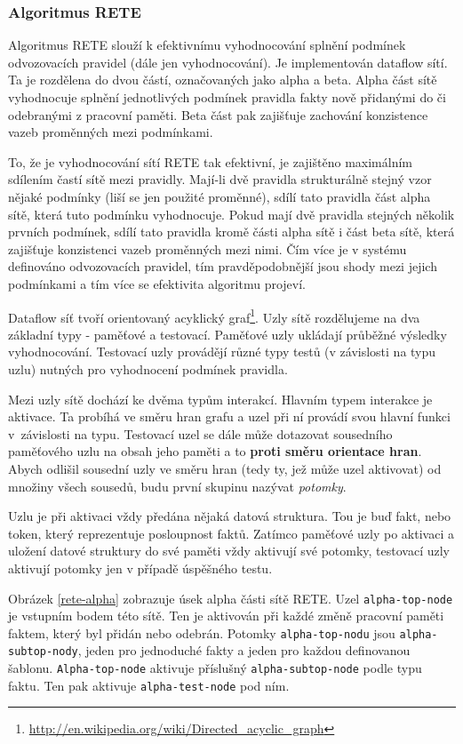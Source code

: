 \subsubsection{Algoritmus RETE}
\label{rete}

Algoritmus RETE slouží k efektivnímu vyhodnocování splnění podmínek odvozovacích
pravidel (dále jen vyhodnocování). Je implementován dataflow sítí. Ta je
rozdělena do dvou částí, označovaných jako alpha a beta. Alpha část sítě
vyhodnocuje splnění jednotlivých podmínek pravidla fakty nově přidanými do či
odebranými z pracovní paměti. Beta část pak zajišťuje zachování konzistence
vazeb proměnných mezi podmínkami.

To, že je vyhodnocování sítí RETE tak efektivní, je zajištěno maximálním
sdílením častí sítě mezi pravidly. Mají-li dvě pravidla strukturálně stejný vzor
nějaké podmínky (liší se jen použité proměnné), sdílí tato pravidla část alpha
sítě, která tuto podmínku vyhodnocuje. Pokud mají dvě pravidla stejných několik
prvních podmínek, sdílí tato pravidla kromě části alpha sítě i část beta sítě,
která zajišťuje konzistenci vazeb proměnných mezi nimi. Čím více je v systému
definováno odvozovacích pravidel, tím pravděpodobnější jsou shody mezi jejich
podmínkami a tím více se efektivita algoritmu projeví.

Dataflow síť tvoří orientovaný acyklický
graf\footnote{\url{http://en.wikipedia.org/wiki/Directed\_acyclic\_graph}}. Uzly
sítě rozdělujeme na dva základní typy - paměťové a testovací. Paměťové uzly
ukládají průběžné výsledky vyhodnocování. Testovací uzly provádějí různé typy
testů (v závislosti na typu uzlu) nutných pro vyhodnocení podmínek pravidla.

Mezi uzly sítě dochází ke dvěma typům interakcí. Hlavním typem interakce je
aktivace. Ta probíhá ve směru hran grafu a uzel při ní provádí svou hlavní
funkci v~závislosti na typu. Testovací uzel se dále může dotazovat sousedního
paměťového uzlu na obsah jeho paměti a to \textbf{proti směru orientace hran}.
Abych odlišil sousední uzly ve směru hran (tedy ty, jež může uzel aktivovat) od
množiny všech sousedů, budu první skupinu nazývat \emph{potomky}.

Uzlu je při aktivaci vždy předána nějaká datová struktura. Tou je buď fakt, nebo
token, který reprezentuje posloupnost faktů. Zatímco paměťové uzly po aktivaci a
uložení datové struktury do své paměti vždy aktivují své potomky, testovací uzly
aktivují potomky jen v případě úspěšného testu.

Obrázek \ref{rete-alpha} zobrazuje úsek alpha části sítě RETE. Uzel
\verb|alpha-top-node| je vstupním bodem této sítě. Ten je aktivován při každé
změně pracovní paměti faktem, který byl přidán nebo odebrán. Potomky
\verb|alpha-top-nodu| jsou \verb|alpha-subtop-nody|, jeden pro jednoduché fakty
a jeden pro každou definovanou šablonu. \verb|Alpha-top-node| aktivuje příslušný
\verb|alpha-subtop-node| podle typu faktu. Ten pak aktivuje
\verb|alpha-test-node| pod ním.

